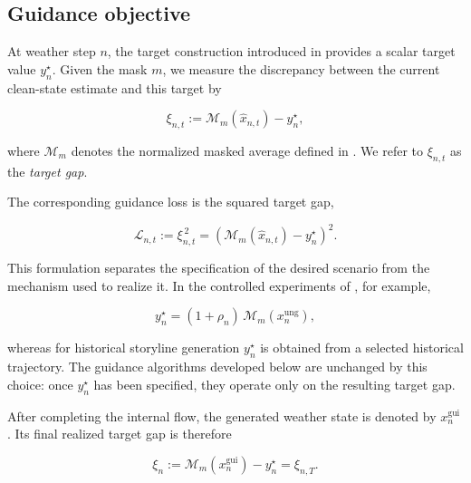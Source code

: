 \subsection{Guidance objective}
\label{sec:guidance-objective}

At weather step \(n\), the target construction introduced in
 provides a scalar target value \(y_n^\star\). Given the mask
\(m\), we measure the discrepancy between the current clean-state estimate and
this target by

\begin{equation}
    \xi_{n,t}
    :=
    \mathcal{M}_m(\hat{x}_{n,t}) - y_n^\star ,
    \label{eq:guidance-gap}
\end{equation}

where \(\mathcal{M}_m\) denotes the normalized masked average defined in
. We refer to \(\xi_{n,t}\) as the \emph{target gap}.

The corresponding guidance loss is the squared target gap,

\begin{equation}
    \mathcal{L}_{n,t}
    :=
    \xi_{n,t}^{\,2}
    =
    \left(
        \mathcal{M}_m(\hat{x}_{n,t}) - y_n^\star
    \right)^2 .
    \label{eq:guidance-loss}
\end{equation}

This formulation separates the specification of the desired scenario from the
mechanism used to realize it. In the controlled experiments of
, for example,

\begin{equation}
    y_n^\star
    =
    (1+\rho_n)\,
    \mathcal{M}_m(x_n^{\mathrm{ung}}),
    \label{eq:controlled-guidance-target}
\end{equation}

whereas for historical storyline generation \(y_n^\star\) is obtained from a
selected historical trajectory. The guidance algorithms developed below are
unchanged by this choice: once \(y_n^\star\) has been specified, they operate
only on the resulting target gap.

After completing the internal flow, the generated weather state is denoted by
\(x_n^{\mathrm{gui}}\). Its final realized target gap is therefore

\begin{equation}
    \xi_n
    :=
    \mathcal{M}_m(x_n^{\mathrm{gui}}) - y_n^\star
    =
    \xi_{n,T}.
    \label{eq:final-guidance-gap}
\end{equation}

